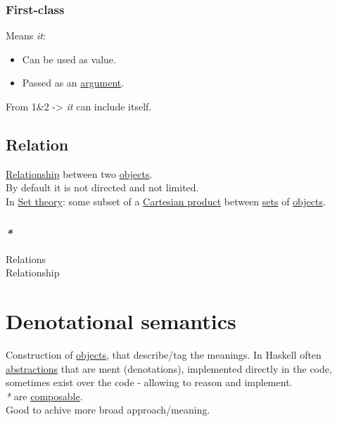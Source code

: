\documentclass[a4paper,14pt,oneside]{book}
\begin{document}
\subsubsection{\label{org8b4de61}First-class}
\label{sec:org297df0c}
Means \emph{it}:\\
\begin{itemize}
\item Can be used as value.\\
\item Passed as an \hyperref[org34483c4]{argument}.\\
\end{itemize}
From 1\&2 -> \emph{it} can include itself.\\

\subsection{\label{org3c53961}Relation}
\label{sec:orgf191134}
\hyperref[org656d550]{Relationship} between two \hyperref[org75bbfb1]{objects}.\\
By default it is not directed and not limited.\\
In \hyperref[org70cfe00]{Set theory}: some subset of a \hyperref[org3386f0d]{Cartesian product} between \hyperref[orgd283771]{sets} of \hyperref[org75bbfb1]{objects}.\\

\subsubsection{\emph{*}}
\label{sec:orge6547ad}

\label{org34ac39e}Relations\\
\label{org656d550}Relationship\\

\section{\label{org1e43a1f}Denotational semantics}
\label{sec:org47b8036}
Construction of \hyperref[org75bbfb1]{objects}, that describe/tag the meanings. In Haskell often \hyperref[org9c4a5fd]{abstractions} that are ment (denotations), implemented directly in the code, sometimes exist over the code - allowing to reason and implement.\\

\emph{*} are \hyperref[orgeb1e07f]{composable}.\\

Good to achive more broad approach/meaning.\\
\end{document}
